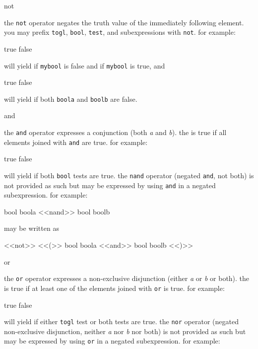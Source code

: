 \begin{marglist}
\appto\marglistfont{\verbatimfont}

\item[not]

the \texttt{not} operator negates the truth value of the immediately following element. you may prefix \texttt{togl}, \texttt{bool}, \texttt{test}, and subexpressions with \texttt{not}. for example:

\begin{ltxcode}
{true}
{false}
\end{ltxcode}
%
will yield  if \texttt{mybool} is false and  if \texttt{mybool} is true, and

\begin{ltxcode}
{true}
{false}
\end{ltxcode}
%
will yield  if both \texttt{boola} and \texttt{boolb} are false.

\item[and]

the \texttt{and} operator expresses a conjunction (both \emph{a} and \emph{b}). the  is true if all elements joined with \texttt{and} are true. for example:

\begin{ltxcode}
{true}
{false}
\end{ltxcode}
%
will yield  if both \texttt{bool} tests are true. the \texttt{nand} operator (negated \texttt{and}, \ie not both) is not provided as such but may be expressed by using \texttt{and} in a negated subexpression. for example:

\begin{ltxcode}
bool {boola} <<nand>> bool {boolb}
\end{ltxcode}
%
may be written as

\begin{ltxcode}
<<not>> <<(>> bool {boola} <<and>> bool {boolb} <<)>>
\end{ltxcode}

\item[or]

the \texttt{or} operator expresses a non-exclusive disjunction (either \emph{a} or \emph{b} or both). the  is true if at least one of the elements joined with \texttt{or} is true. for example:

\begin{ltxcode}
{true}
{false}
\end{ltxcode}
%
will yield  if either \texttt{togl} test or both tests are true. the \texttt{nor} operator (negated non-exclusive disjunction, \ie neither \emph{a} nor \emph{b} nor both) is not provided as such but may be expressed by using \texttt{or} in a negated subexpression. for example:


\end{marglist}
